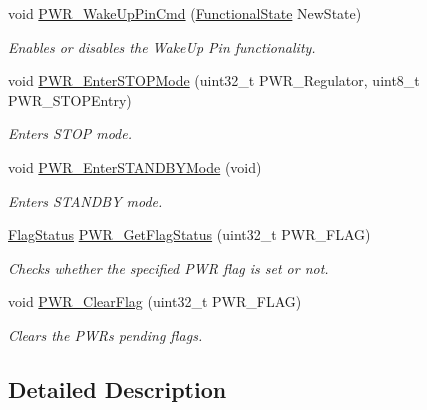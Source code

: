 \begin{DoxyCompactItemize}
void \mbox{\hyperlink{group___p_w_r___private___functions_gae5fd6f9336ef8c60d5483651cb0d1a00}{P\+W\+R\+\_\+\+Wake\+Up\+Pin\+Cmd}} (\mbox{\hyperlink{group___exported__types_gac9a7e9a35d2513ec15c3b537aaa4fba1}{Functional\+State}} New\+State)
\begin{DoxyCompactList}\small\item\em Enables or disables the Wake\+Up Pin functionality. \end{DoxyCompactList}\item 
void \mbox{\hyperlink{group___p_w_r___private___functions_ga694676ac06a9baf50eae45adae0118ab}{P\+W\+R\+\_\+\+Enter\+S\+T\+O\+P\+Mode}} (uint32\+\_\+t P\+W\+R\+\_\+\+Regulator, uint8\+\_\+t P\+W\+R\+\_\+\+S\+T\+O\+P\+Entry)
\begin{DoxyCompactList}\small\item\em Enters S\+T\+OP mode. \end{DoxyCompactList}\item 
void \mbox{\hyperlink{group___p_w_r___private___functions_ga00ddae00a9c327b81b24d2597b0052f3}{P\+W\+R\+\_\+\+Enter\+S\+T\+A\+N\+D\+B\+Y\+Mode}} (void)
\begin{DoxyCompactList}\small\item\em Enters S\+T\+A\+N\+D\+BY mode. \end{DoxyCompactList}\item 
\mbox{\hyperlink{group___exported__types_ga89136caac2e14c55151f527ac02daaff}{Flag\+Status}} \mbox{\hyperlink{group___p_w_r___private___functions_gaa980163a4d83304280ee34942464b4ec}{P\+W\+R\+\_\+\+Get\+Flag\+Status}} (uint32\+\_\+t P\+W\+R\+\_\+\+F\+L\+AG)
\begin{DoxyCompactList}\small\item\em Checks whether the specified P\+WR flag is set or not. \end{DoxyCompactList}\item 
void \mbox{\hyperlink{group___p_w_r___private___functions_ga01c4b2fbd16514b993324e101c3ddf7c}{P\+W\+R\+\_\+\+Clear\+Flag}} (uint32\+\_\+t P\+W\+R\+\_\+\+F\+L\+AG)
\begin{DoxyCompactList}\small\item\em Clears the P\+WR\textquotesingle{}s pending flags. \end{DoxyCompactList}\end{DoxyCompactItemize}


\subsection{Detailed Description}


